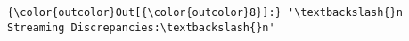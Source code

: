 \documentclass[11pt]{article}
\begin{document}
\begin{Verbatim}[commandchars=\\\{\}]
{\color{outcolor}Out[{\color{outcolor}8}]:} '\textbackslash{}n    Streaming Discrepancies:\textbackslash{}n'
\end{Verbatim}
            

    
    
    
    
\end{document}
